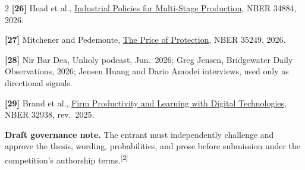 \documentclass[10pt,letterpaper]{article}
\newcommand{\src}[1]{\textsuperscript{\color{accent}[#1]}}
\begin{document}
{\begin{multicols}{2}
\textbf{[26]} Head et al., \href{https://www.nber.org/papers/w34884}{Industrial Policies for Multi-Stage Production}, NBER 34884, 2026.

\textbf{[27]} Mitchener and Pedemonte, \href{https://www.nber.org/papers/w35249}{The Price of Protection}, NBER 35249, 2026.

\textbf{[28]} Nir Bar Dea, Unholy podcast, Jun.\ 2026; Greg Jensen, Bridgewater Daily Observations, 2026; Jensen Huang and Dario Amodei interviews, used only as directional signals.

\textbf{[29]} Brand et al., \href{https://www.nber.org/papers/w32938}{Firm Productivity and Learning with Digital Technologies}, NBER 32938, rev.\ 2025.

\vfill
\textbf{\color{draftred}Draft governance note.} The entrant must independently
challenge and approve the thesis, wording, probabilities, and prose before
submission under the competition's authorship terms.\src{2}

\end{multicols}
}
\end{document}
